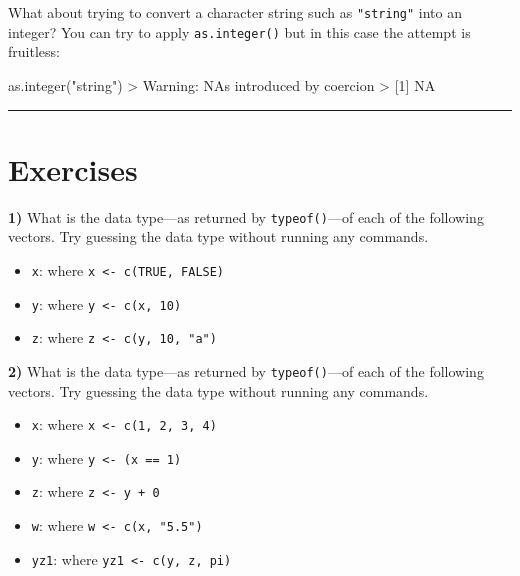\documentclass[
]{book}
\newenvironment{Shaded}{\begin{snugshade}}{\end{snugshade}}
\newcommand{\ConstantTok}[1]{\textcolor[rgb]{0.00,0.00,0.00}{#1}}
\newcommand{\DecValTok}[1]{\textcolor[rgb]{0.00,0.00,0.81}{#1}}
\newcommand{\FunctionTok}[1]{\textcolor[rgb]{0.00,0.00,0.00}{#1}}
\newcommand{\NormalTok}[1]{#1}
\newcommand{\SpecialCharTok}[1]{\textcolor[rgb]{0.00,0.00,0.00}{#1}}
\newcommand{\StringTok}[1]{\textcolor[rgb]{0.31,0.60,0.02}{#1}}
\begin{document}
What about trying to convert a character string such as \texttt{"string"} into an
integer? You can try to apply \texttt{as.integer()} but in this case the attempt is
fruitless:

\begin{Shaded}
\begin{Highlighting}[]
\FunctionTok{as.integer}\NormalTok{(}\StringTok{"string"}\NormalTok{)}
\SpecialCharTok{\textgreater{}}\NormalTok{ Warning}\SpecialCharTok{:}\NormalTok{ NAs introduced by coercion}
\SpecialCharTok{\textgreater{}}\NormalTok{ [}\DecValTok{1}\NormalTok{] }\ConstantTok{NA}
\end{Highlighting}
\end{Shaded}

\begin{center}\rule{0.5\linewidth}{0.5pt}\end{center}

\hypertarget{exercises-2}{%
\section{Exercises}\label{exercises-2}}

\textbf{1)} What is the data type---as returned by \texttt{typeof()}---of each of the
following vectors. Try guessing the data type without running any commands.

\begin{itemize}
\item
  \texttt{x}: where \texttt{x\ \textless{}-\ c(TRUE,\ FALSE)}
\item
  \texttt{y}: where \texttt{y\ \textless{}-\ c(x,\ 10)}
\item
  \texttt{z}: where \texttt{z\ \textless{}-\ c(y,\ 10,\ "a")}
\end{itemize}

\textbf{2)} What is the data type---as returned by \texttt{typeof()}---of each of the
following vectors. Try guessing the data type without running any commands.

\begin{itemize}
\item
  \texttt{x}: where \texttt{x\ \textless{}-\ c(\textquotesingle{}1\textquotesingle{},\ \textquotesingle{}2\textquotesingle{},\ \textquotesingle{}3\textquotesingle{},\ \textquotesingle{}4\textquotesingle{})}
\item
  \texttt{y}: where \texttt{y\ \textless{}-\ (x\ ==\ 1)}
\item
  \texttt{z}: where \texttt{z\ \textless{}-\ y\ +\ 0}
\item
  \texttt{w}: where \texttt{w\ \textless{}-\ c(x,\ "5.5")}
\item
  \texttt{yz1}: where \texttt{yz1\ \textless{}-\ c(y,\ z,\ pi)}
\end{itemize}
\end{document}
